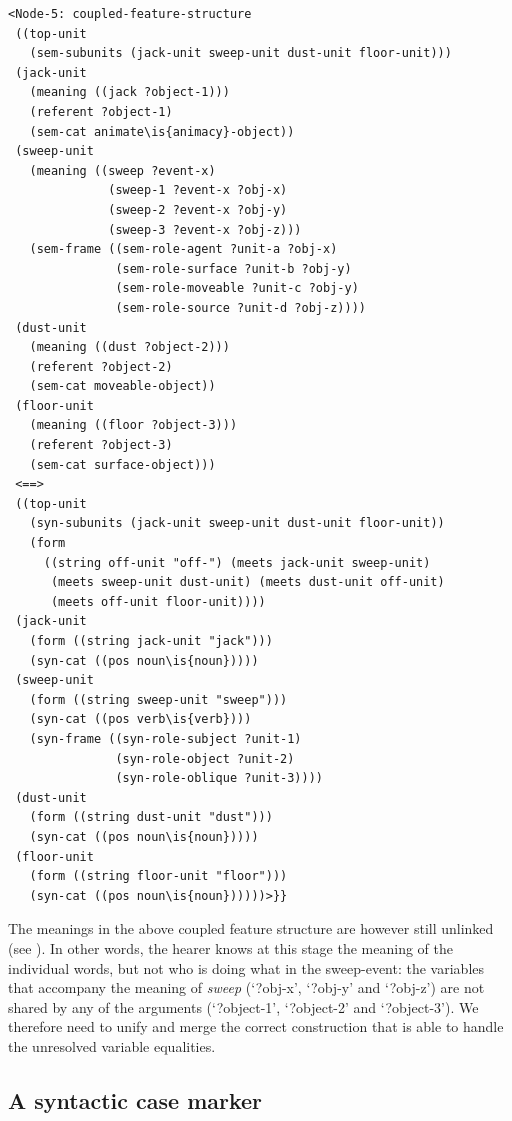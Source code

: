 \ea
\begin{lstlisting}
<Node-5: coupled-feature-structure
 ((top-unit
   (sem-subunits (jack-unit sweep-unit dust-unit floor-unit)))
 (jack-unit
   (meaning ((jack ?object-1)))
   (referent ?object-1)
   (sem-cat animate\is{animacy}-object))
 (sweep-unit
   (meaning ((sweep ?event-x)
              (sweep-1 ?event-x ?obj-x)
              (sweep-2 ?event-x ?obj-y)
              (sweep-3 ?event-x ?obj-z)))
   (sem-frame ((sem-role-agent ?unit-a ?obj-x)
               (sem-role-surface ?unit-b ?obj-y)
               (sem-role-moveable ?unit-c ?obj-y)
               (sem-role-source ?unit-d ?obj-z))))
 (dust-unit
   (meaning ((dust ?object-2)))
   (referent ?object-2)
   (sem-cat moveable-object))
 (floor-unit
   (meaning ((floor ?object-3)))
   (referent ?object-3)
   (sem-cat surface-object)))
 <==>
 ((top-unit
   (syn-subunits (jack-unit sweep-unit dust-unit floor-unit))
   (form 
     ((string off-unit "off-") (meets jack-unit sweep-unit)
      (meets sweep-unit dust-unit) (meets dust-unit off-unit)  
      (meets off-unit floor-unit))))
 (jack-unit
   (form ((string jack-unit "jack")))
   (syn-cat ((pos noun\is{noun}))))
 (sweep-unit
   (form ((string sweep-unit "sweep")))
   (syn-cat ((pos verb\is{verb})))
   (syn-frame ((syn-role-subject ?unit-1)
               (syn-role-object ?unit-2)
               (syn-role-oblique ?unit-3))))
 (dust-unit
   (form ((string dust-unit "dust")))
   (syn-cat ((pos noun\is{noun}))))
 (floor-unit
   (form ((string floor-unit "floor")))
   (syn-cat ((pos noun\is{noun})))))>}}

\end{lstlisting}
\z

The meanings in the above coupled feature structure are however still unlinked (see ). In other words, the hearer knows at this stage the meaning of the individual words, but not who is doing what in the sweep-event: the variables that accompany the meaning of {\em sweep} (`?obj-x', `?obj-y' and `?obj-z') are not shared by any of the arguments (`?object-1', `?object-2' and `?object-3'). We therefore need to unify and merge the correct construction that is able to handle the unresolved variable equalities.

\subsection{A syntactic case marker}
\label{s:morph-rule}

